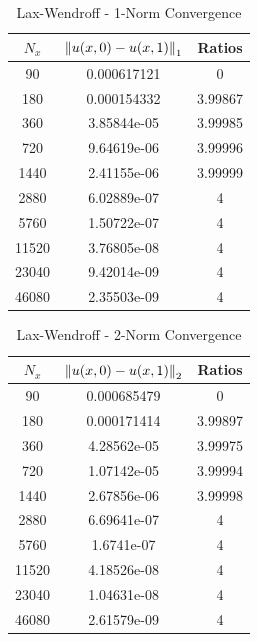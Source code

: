 \documentclass[12pt]{article}
\begin{document}
\begin{enumerate}[(a)]
\begin{minipage}{0.5\textwidth}
\begin{table}[H]
\caption{Lax-Wendroff - 1-Norm Convergence}
\centering\begin{tabular}{||c|cc||}
\hline \hline
    $N_x$ & $\norm{u(x,0)-u(x,1)}_1$ &  Ratios \\
\hline
    90 &    0.000617121 &  0       \\
   180 &    0.000154332 &  3.99867 \\
   360 &    3.85844e-05 &  3.99985 \\
   720 &    9.64619e-06 &  3.99996 \\
  1440 &    2.41155e-06 &  3.99999 \\
  2880 &    6.02889e-07 &  4       \\
  5760 &    1.50722e-07 &  4       \\
 11520 &    3.76805e-08 &  4       \\
 23040 &    9.42014e-09 &  4       \\
 46080 &    2.35503e-09 &  4       \\
\hline \hline
\end{tabular}
\end{table}
\end{minipage}
\begin{minipage}{0.5\textwidth}
\begin{table}[H]
\caption{Lax-Wendroff - 2-Norm Convergence}
\centering\begin{tabular}{||c|cc||}
\hline \hline
$N_x$  & $\norm{u(x,0)-u(x,1)}_2$ &  Ratios \\
\hline
    90 &    0.000685479 &  0       \\
   180 &    0.000171414 &  3.99897 \\
   360 &    4.28562e-05 &  3.99975 \\
   720 &    1.07142e-05 &  3.99994 \\
  1440 &    2.67856e-06 &  3.99998 \\
  2880 &    6.69641e-07 &  4       \\
  5760 &    1.6741e-07  &  4       \\
 11520 &    4.18526e-08 &  4       \\
 23040 &    1.04631e-08 &  4       \\
 46080 &    2.61579e-09 &  4       \\
\hline \hline
\end{tabular}
\end{table}
\end{minipage}

\end{enumerate}
\end{document}
